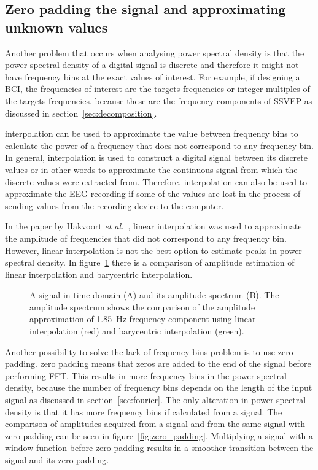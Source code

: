 \subsection{Zero padding the signal and approximating unknown values}

Another problem that occurs when analysing \gls{power spectral density} is that the \gls{power spectral density} of a \gls{digital signal} is discrete and therefore it might not have \glspl{frequency bin} at the exact values of interest. For example, if designing a \gls{BCI}, the frequencies of interest are the \glspl{target} frequencies or integer multiples of the \glspl{target} frequencies, because these are the \glspl{frequency component} of \gls{SSVEP} as discussed in section~\ref{sec:decomposition}.

\Gls{interpolation} can be used to approximate the value between \glspl{frequency bin} to calculate the power of a frequency that does not correspond to any \gls{frequency bin}. In general, \gls{interpolation} is used to construct a \gls{digital signal} between its discrete values or in other words to approximate the continuous signal from which the discrete values were extracted from. Therefore, \gls{interpolation} can also be used to approximate the \gls{EEG} recording if some of the values are lost in the process of sending values from the recording device to the computer.

In the paper by Hakvoort \textit{et al.}~\cite{cca_psda}, linear interpolation was used to approximate the amplitude of frequencies that did not correspond to any \gls{frequency bin}. However, linear interpolation is not the best option to estimate peaks in \gls{power spectral density}. In figure~\ref{fig:interpolation} there is a comparison of amplitude estimation of linear interpolation and barycentric interpolation.

\begin{figure}[h!]
	
	\caption{A signal in time domain (A) and its amplitude spectrum (B). The amplitude spectrum shows the comparison of the amplitude approximation of \SI{1.85}{Hz} frequency component using linear interpolation (red) and barycentric interpolation (green).}
	\label{fig:interpolation}
\end{figure}

Another possibility to solve the lack of \glspl{frequency bin} problem is to use \gls{zero padding}. \Gls{zero padding} means that zeros are added to the end of the signal before performing \gls{FFT}. This results in more \glspl{frequency bin} in the \gls{power spectral density}, because the number of \glspl{frequency bin} depends on the length of the input signal as discussed in section~\ref{sec:fourier}. The only alteration in \gls{power spectral density} is that it has more \glspl{frequency bin} if calculated from a  signal. The comparison of amplitudes acquired from a signal and from the same signal with \gls{zero padding} can be seen in figure~\ref{fig:zero_padding}. Multiplying a signal with a \gls{window} function before \gls{zero padding} results in a smoother transition between the signal and its \gls{zero padding}.

